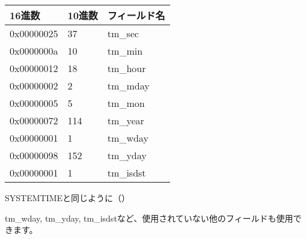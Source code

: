 \begin{center}
\begin{tabular}{ | l | l | l | }
\hline
\headercolor{} 16進数 & 
\headercolor{} 10進数 & 
\headercolor{} フィールド名 \\
\hline
0x00000025 & 37 	& tm\_sec \\
\hline
0x0000000a & 10 	& tm\_min \\
\hline
0x00000012 & 18 	& tm\_hour \\	
\hline
0x00000002 & 2 		& tm\_mday \\	
\hline
0x00000005 & 5 		& tm\_mon \\	
\hline
0x00000072 & 114 	& tm\_year \\
\hline
0x00000001 & 1 		& tm\_wday \\	
\hline
0x00000098 & 152 	& tm\_yday \\	
\hline
0x00000001 & 1 		& tm\_isdst \\
\hline
\end{tabular}
\end{center}

SYSTEMTIMEと同じように（）

tm\_wday, tm\_yday, tm\_isdstなど、使用されていない他のフィールドも使用できます。
